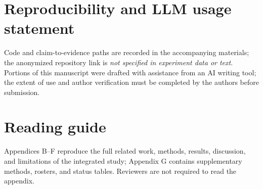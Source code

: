 \documentclass{article}
\newcommand{\missinginfo}{\textit{not specified in experiment data or text}}
\begin{document}
\section*{Reproducibility and LLM usage statement}
Code and claim-to-evidence paths are recorded in the accompanying materials; the anonymized repository link is \missinginfo.
Portions of this manuscript were drafted with assistance from an AI writing tool; the extent of use and author verification must be completed by the authors before submission.




\clearpage
\appendix
\section{Reading guide}
\label{app:extended}
Appendices B--F reproduce the full related work, methods, results, discussion, and limitations of the integrated study; Appendix G contains supplementary methods, rosters, and status tables.
Reviewers are not required to read the appendix.



\end{document}
